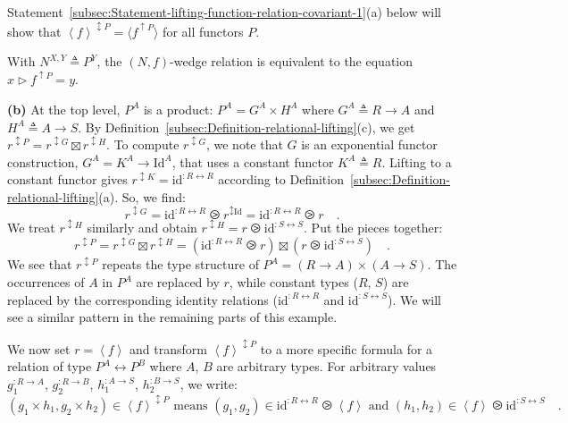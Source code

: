 Statement~\ref{subsec:Statement-lifting-function-relation-covariant-1}(a)
below will show that $\left<f\right>^{\updownarrow P}=\langle f^{\uparrow P}\rangle$
for all functors $P$.

With $N^{X,Y}\triangleq P^{Y}$, the $\left(N,f\right)$-wedge relation
is equivalent to the equation $x\triangleright f^{\uparrow P}=y$.

\textbf{(b)} At the top level, $P^{A}$ is a product: $P^{A}=G^{A}\times H^{A}$
where $G^{A}\triangleq R\rightarrow A$ and $H^{A}\triangleq A\rightarrow S$.
By Definition~\ref{subsec:Definition-relational-lifting}(c), we
get $r^{\updownarrow P}=r^{\updownarrow G}\boxtimes r^{\updownarrow H}$.
To compute $r^{\updownarrow G}$, we note that $G$ is an exponential
functor construction, $G^{A}=K^{A}\rightarrow\text{Id}^{A}$, that
uses a constant functor $K^{A}\triangleq R$. Lifting to a constant
functor gives $r^{\updownarrow K}=\text{id}^{:R\leftrightarrow R}$
according to Definition~\ref{subsec:Definition-relational-lifting}(a).
So, we find:
\[
r^{\updownarrow G}=\text{id}^{:R\leftrightarrow R}\ogreaterthan r^{\updownarrow\text{Id}}=\text{id}^{:R\leftrightarrow R}\ogreaterthan r\quad.
\]
We treat $r^{\updownarrow H}$ similarly and obtain $r^{\updownarrow H}=r\ogreaterthan\text{id}^{:S\leftrightarrow S}$.
Put the pieces together:
\[
r^{\updownarrow P}=r^{\updownarrow G}\boxtimes r^{\updownarrow H}=(\text{id}^{:R\leftrightarrow R}\ogreaterthan r)\boxtimes(r\ogreaterthan\text{id}^{:S\leftrightarrow S})\quad.
\]
We see that $r^{\updownarrow P}$ repeats the type structure of $P^{A}=(R\rightarrow A)\times(A\rightarrow S)$.
The occurrences of $A$ in $P^{A}$ are replaced by $r$, while constant
types ($R$, $S$) are replaced by the corresponding identity relations
($\text{id}^{:R\leftrightarrow R}$ and $\text{id}^{:S\leftrightarrow S}$).
We will see a similar pattern in the remaining parts of this example.

We now set $r=\left<f\right>$ and transform $\left<f\right>^{\updownarrow P}$
to a more specific formula for a relation of type $P^{A}\leftrightarrow P^{B}$
where $A$, $B$ are arbitrary types. For arbitrary values $g_{1}^{:R\rightarrow A}$,
$g_{2}^{:R\rightarrow B}$, $h_{1}^{:A\rightarrow S}$, $h_{2}^{:B\rightarrow S}$,
we write:
\[
(g_{1}\times h_{1},g_{2}\times h_{2})\in\left<f\right>^{\updownarrow P}\text{ means }(g_{1},g_{2})\in\text{id}^{:R\leftrightarrow R}\ogreaterthan\left<f\right>\text{ and }(h_{1},h_{2})\in\left<f\right>\ogreaterthan\text{id}^{:S\leftrightarrow S}\quad.
\]

